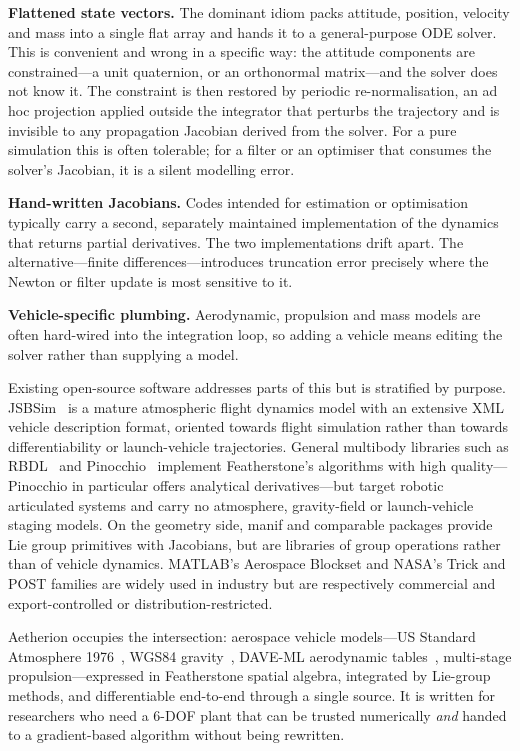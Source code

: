 \documentclass[preprint,12pt,a4paper]{elsarticle}
\begin{document}
\textbf{Flattened state vectors.} The dominant idiom packs attitude, position,
velocity and mass into a single flat array and hands it to a general-purpose
ODE solver. This is convenient and wrong in a specific way: the attitude
components are constrained---a unit quaternion, or an orthonormal matrix---and
the solver does not know it. The constraint is then restored by periodic
re-normalisation, an ad hoc projection applied outside the integrator that
perturbs the trajectory and is invisible to any propagation Jacobian derived
from the solver. For a pure simulation this is often tolerable; for a filter or
an optimiser that consumes the solver's Jacobian, it is a silent modelling
error.

\textbf{Hand-written Jacobians.} Codes intended for estimation or optimisation
typically carry a second, separately maintained implementation of the dynamics
that returns partial derivatives. The two implementations drift apart. The
alternative---finite differences---introduces truncation error precisely where
the Newton or filter update is most sensitive to it.

\textbf{Vehicle-specific plumbing.} Aerodynamic, propulsion and mass models are
often hard-wired into the integration loop, so adding a vehicle means editing
the solver rather than supplying a model.

Existing open-source software addresses parts of this but is stratified by
purpose. JSBSim~\cite{berndt2004jsbsim} is a mature atmospheric flight dynamics
model with an extensive XML vehicle description format, oriented towards flight
simulation rather than towards differentiability or launch-vehicle
trajectories. General multibody libraries such as RBDL~\cite{felis2017rbdl} and
Pinocchio~\cite{carpentier2019pinocchio} implement Featherstone's algorithms
with high quality---Pinocchio in particular offers analytical
derivatives---but target robotic articulated systems and carry no atmosphere,
gravity-field or launch-vehicle staging models. On the geometry side, manif
\cite{deray2020manif} and comparable packages provide Lie group primitives with
Jacobians, but are libraries of group operations rather than of vehicle
dynamics. MATLAB's Aerospace Blockset and NASA's Trick and POST families are
widely used in industry but are respectively commercial and export-controlled
or distribution-restricted.

Aetherion occupies the intersection: aerospace vehicle models---US Standard
Atmosphere 1976~\cite{usstd1976}, WGS84 gravity~\cite{nima2000wgs84}, DAVE-ML
aerodynamic tables~\cite{jackson2002daveml}, multi-stage
propulsion---expressed in Featherstone spatial algebra, integrated by Lie-group
methods, and differentiable end-to-end through a single source. It is written
for researchers who need a 6-DOF plant that can be trusted numerically
\emph{and} handed to a gradient-based algorithm without being rewritten.
\end{document}
